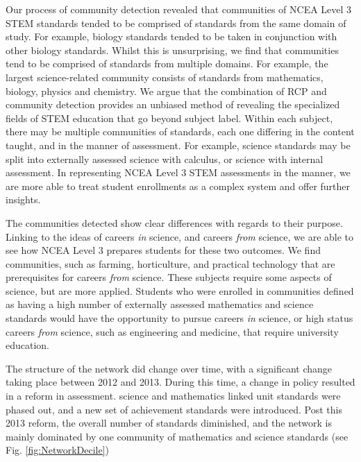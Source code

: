 \documentclass[a4paper]{article}
\begin{document}
Our process of community detection revealed that communities of NCEA Level 3 STEM standards tended to be comprised of standards from the same domain of study. For example, biology standards tended to be taken in conjunction with other biology standards. Whilst this is unsurprising, we find that communities tend to be comprised of standards from multiple domains. For example, the largest science-related community consists of standards from mathematics, biology, physics and chemistry. We argue that the combination of RCP and community detection provides an unbiased method of revealing the specialized fields of STEM education that go beyond subject label. Within each subject, there may be multiple communities of standards, each one differing in the content taught, and in the manner of assessment. For example, science standards may be split into externally assessed science with calculus, or science with internal assessment. In representing NCEA Level 3 STEM assessments in the manner, we are more able to treat student enrollments as a complex system and offer further insights. 

The communities detected show clear differences with regards to their purpose. Linking to the ideas of careers \textit{in} science, and careers \textit{from} science\cite[p.20]{wong2016science}, we are able to see how NCEA Level 3 prepares students for these two outcomes. We find communities, such as farming, horticulture, and practical technology that are prerequisites for careers \textit{from} science. These subjects require some aspects of science, but are more applied. Students who were enrolled in communities defined as having a high number of externally assessed mathematics and science standards would have the opportunity to pursue careers \textit{in} science, or high status careers \textit{from} science, such as engineering and medicine, that require university education.

The structure of the network did change over time, with a significant change taking place between 2012 and 2013. During this time, a change in policy resulted in a reform in assessment. science and mathematics linked unit standards were phased out, and a new set of achievement standards were introduced. Post this 2013 reform, the overall number of standards diminished, and the network is mainly dominated by one community of mathematics and science standards (see Fig. \ref{fig:NetworkDecile})
\end{document}
